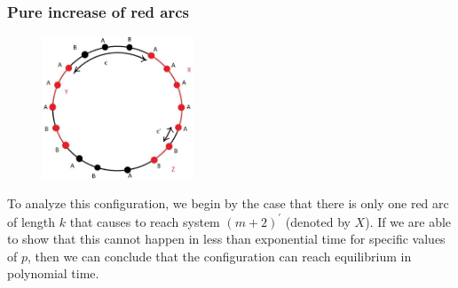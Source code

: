 \documentclass[]{book}
\theoremstyle{definition}
\begin{document}





\subsubsection{Pure increase of red arcs}
\begin{figure}[H]
    \centering
    \includegraphics[width=0.4\textwidth]{figures/sync_pure_increase_general.jpg}
    \caption{}
\end{figure}

To analyze this configuration, we begin by the case that there is only one red arc of length $k$ that causes to reach system $(m+2)^\prime$ (denoted by $X$). If we are able to show that this cannot happen in less than exponential time for specific values of $p$, then we can conclude that the configuration can reach equilibrium in polynomial time.
\end{document}
